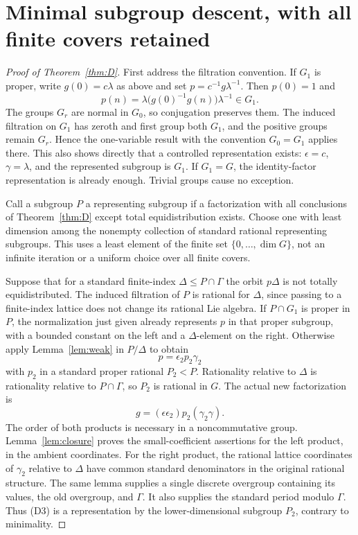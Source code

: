 \documentclass[11pt]{article}
\begin{document}
\section{Minimal subgroup descent, with all finite covers retained}
\begin{proof}[Proof of Theorem~\ref{thm:D}]
First address the filtration convention. If $G_1$ is proper, write
$g(0)=c\lambda$ as above and set $p=c^{-1}g\lambda^{-1}$.
Then $p(0)=1$ and
\[
 p(n)=\lambda\bigl(g(0)^{-1}g(n)\bigr)\lambda^{-1}\in G_1.
\]
The groups $G_r$ are normal in $G_0$, so conjugation preserves them.
The induced filtration on $G_1$ has zeroth and first group both $G_1$,
and the positive groups remain $G_r$. Hence the one-variable result with
the convention $G_0=G_1$ applies there. This also shows directly that a
controlled representation exists: $\epsilon=c$, $\gamma=\lambda$,
and the represented subgroup is $G_1$. If $G_1=G$, the identity-factor
representation is already enough. Trivial groups cause no exception.

Call a subgroup $P$ a representing subgroup if a factorization with all
conclusions of Theorem~\ref{thm:D} except total equidistribution exists.
Choose one with least dimension among the nonempty collection of standard
rational representing subgroups. This uses a least element of the finite
set $\{0,\ldots,\dim G\}$, not an infinite iteration or a uniform choice
over all finite covers.

Suppose that for a standard finite-index $\Delta\leq P\cap\Gamma$ the
orbit $p\Delta$ is not totally equidistributed. The induced filtration of
$P$ is rational for $\Delta$, since passing to a finite-index lattice
does not change its rational Lie algebra. If $P\cap G_1$ is proper in $P$,
the normalization just given already represents $p$ in that proper subgroup,
with a bounded constant on the left and a $\Delta$-element on the right.
Otherwise apply Lemma~\ref{lem:weak} in $P/\Delta$ to obtain
\[
                 p=\epsilon_2p_2\gamma_2
\]
with $p_2$ in a standard proper rational $P_2<P$.
Rationality relative to $\Delta$ is rationality relative to $P\cap\Gamma$,
so $P_2$ is rational in $G$. The actual new factorization is
\[
                 g=(\epsilon\epsilon_2)p_2(\gamma_2\gamma).    \tag{D3}
\]
The order of both products is necessary in a noncommutative group.
Lemma~\ref{lem:closure} proves the small-coefficient assertions for the left
product, in the ambient coordinates. For the right product, the rational
lattice coordinates of $\gamma_2$ relative to $\Delta$ have common standard
denominators in the original rational structure. The same lemma supplies a
single discrete overgroup containing its values, the old overgroup, and
$\Gamma$. It also supplies the standard period modulo $\Gamma$.
Thus (D3) is a representation by the lower-dimensional subgroup $P_2$,
contrary to minimality.


\end{proof}
\end{document}
